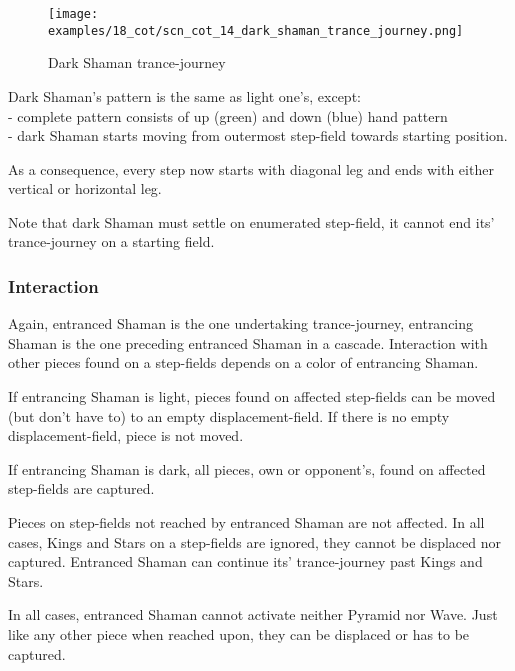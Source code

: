\noindent
\begin{figure}[!h]
\texttt{[image: examples/18\_cot/scn\_cot\_14\_dark\_shaman\_trance\_journey.png]}
\caption{Dark Shaman trance-journey}
\label{fig:scn_cot_14_dark_shaman_trance_journey}
\end{figure}

Dark Shaman's pattern is the same as light one's, except: \\
- complete pattern consists of up (green) and down (blue) hand pattern \\
- dark Shaman starts moving from outermost step-field towards starting position.

As a consequence, every step now starts with diagonal leg and ends with either
vertical or horizontal leg.


Note that dark Shaman must settle on enumerated step-field, it cannot end its'
trance-journey on a starting field.

\subsubsection*{Interaction}

Again, entranced Shaman is the one undertaking trance-journey, entrancing Shaman
is the one preceding entranced Shaman in a cascade. Interaction with other pieces
found on a step-fields depends on a color of entrancing Shaman.

If entrancing Shaman is light, pieces found on affected step-fields can be moved
(but don't have to) to an empty displacement-field. If there is no empty
displacement-field, piece is not moved.

If entrancing Shaman is dark, all pieces, own or opponent's, found on affected
step-fields are captured.

Pieces on step-fields not reached by entranced Shaman are not affected. In all
cases, Kings and Stars on a step-fields are ignored, they cannot be displaced
nor captured. Entranced Shaman can continue its' trance-journey past Kings and Stars.

In all cases, entranced Shaman cannot activate neither Pyramid nor Wave. Just like
any other piece when reached upon, they can be displaced or has to be captured.


